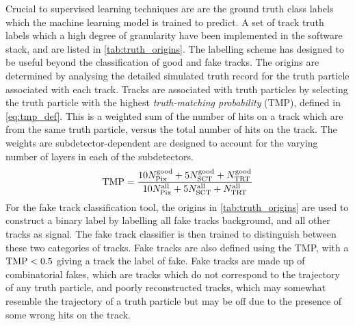 Crucial to supervised learning techniques are are the ground truth class labels which the machine learning model is trained to predict.
A set of track truth labels which a high degree of granularity have been implemented in the \ATLAS software stack, and are listed in \cref{tab:truth_origins}.
The labelling scheme has designed to be useful beyond the classification of good and fake tracks.
The origins are determined by analysing the detailed simulated truth record for the truth particle associated with each track.
Tracks are associated with truth particles by selecting the truth particle with the highest \textit{truth-matching probability} (TMP), defined in \cref{eq:tmp_def}.
This is a weighted sum of the number of hits on a track which are from the same truth particle, versus the total number of hits on the track.
The weights are subdetector-dependent are designed to account for the varying number of layers in each of the subdetectors.
%
\begin{equation}\label{eq:tmp_def}
    \textnormal{TMP} = 
    \frac{
        10 N_{\textnormal{Pix}}^{\textnormal{good}} + 
        5  N_{\textnormal{SCT}}^{\textnormal{good}} + 
           N_{\textnormal{TRT}}^{\textnormal{good}}
        }{
        10 N_{\textnormal{Pix}}^{\textnormal{all}} + 
        5  N_{\textnormal{SCT}}^{\textnormal{all}} + 
            N_{\textnormal{TRT}}^{\textnormal{all}}
        }
\end{equation}
%
For the fake track classification tool, the origins in \cref{tab:truth_origins} are used to construct a binary label by labelling all fake tracks background, and all other tracks as signal.
The fake track classifier is then trained to distinguish between these two categories of tracks.
Fake tracks are also defined using the TMP, with a $\textnormal{TMP} < 0.5$ giving a track the label of fake.
Fake tracks are made up of combinatorial fakes, which are tracks which do not correspond to the trajectory of any truth particle, and poorly reconstructed tracks, which may somewhat resemble the trajectory of a truth particle but may be off due to the presence of some wrong hits on the track.

